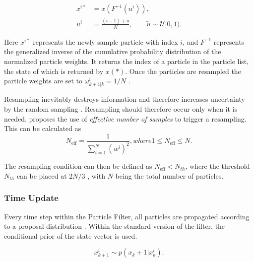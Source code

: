 \begin{align}
	x^{i*} &= x(F^{-1}(u^i)), \\
	u^i &= \frac{(i-1) + \tilde{u}}{N}, \qquad \tilde{u} \sim \mathcal{U}[0,1).
\end{align}	

Here $x^{i*}$ represents the newly sample particle with index $i$, and $F^{-1}$ represents the generalized inverse of the cumulative probability distribution of the normalized particle weights. It returns the index of a particle in the particle list, the state of which is returned by $x(*)$. Once the particles are resampled the particle weights are set to $\omega^i_{k+1|k} = 1/N$ . \par
Resampling inevitably destroys information and therefore increases uncertainty by the random sampling \cite{gustafsson2010particle}. Resampling should therefore occur only when it is needed. \citet{gustafsson2010statistical} proposes the use of  \textit{effective number of samples} to trigger a  resampling. This can be calculated as 
\begin{subequations}
	\begin{equation}
		N_{\mathrm{eff}}=\frac{1}{\sum_{i=1}^{N}\left(w^{i}\right)^{2}},
	\end{equation}
	
	where
	
	\begin{equation}
		1 \leq N_{\mathrm{eff}} \leq N.
	\end{equation}
\end{subequations}

The resampling condition can then be defined as $N_{\mathrm{eff}} < N_{th}$, where the threshold $ N_{th} $ can be placed at $2N/3$ \cite{gustafsson2010statistical}, with $N$ being the total number of particles. \par 

\subsubsection{Time Update}
Every time step within the Particle Filter, all particles are propagated according to a proposal distribution \cite{gustafsson2010particle}. Within the standard version of the filter, the conditional prior of the state vector is used. 

\begin{equation}
	x_{k+1}^{i} \sim p(x_k+1|x^i_{k}).
\end{equation}


